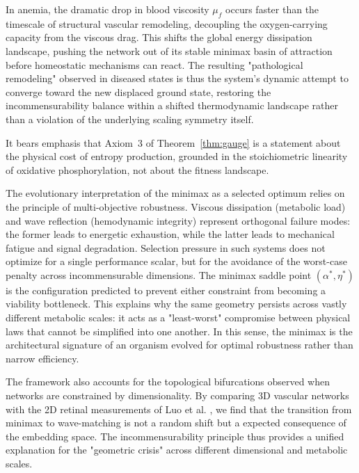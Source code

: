 In anemia, the dramatic drop in blood viscosity $\mu_f$ occurs faster than the
timescale of structural vascular remodeling, decoupling the oxygen-carrying
capacity from the viscous drag. This shifts the global energy dissipation
landscape, pushing the network out of its stable minimax basin of attraction
before homeostatic mechanisms can react. The resulting "pathological remodeling"
observed in diseased states is thus the system's dynamic attempt to converge
toward the new displaced ground state, restoring the incommensurability balance
within a shifted thermodynamic landscape rather than a violation of the
underlying scaling symmetry itself.


It bears emphasis that Axiom~3 of Theorem~\ref{thm:gauge} is a statement about
the physical cost of entropy production, grounded in the stoichiometric
linearity of oxidative phosphorylation, not about the fitness landscape.

\begin{remark}
The evolutionary interpretation of the minimax as a selected optimum relies on
the principle of multi-objective robustness. Viscous dissipation (metabolic
load) and wave reflection (hemodynamic integrity) represent orthogonal failure
modes: the former leads to energetic exhaustion, while the latter leads to
mechanical fatigue and signal degradation. Selection pressure in such systems
does not optimize for a single performance scalar, but for the avoidance of the
worst-case penalty across incommensurable dimensions. The minimax saddle point
$(\alpha^*, \eta^*)$ is the configuration predicted to prevent either
constraint from becoming a viability bottleneck. This explains why the
same geometry persists across vastly different metabolic scales: it acts as
a "least-worst" compromise between physical laws that cannot be simplified into
one another. In this sense, the minimax is the architectural signature of an
organism evolved for optimal robustness rather than narrow efficiency.
\end{remark}

The framework also accounts for the topological bifurcations observed when
networks are constrained by dimensionality. By comparing 3D vascular networks
with the 2D retinal measurements of Luo et al. \cite{luo2017}, we find that the
transition from minimax to wave-matching is not a random shift but a
expected consequence of the embedding space. The incommensurability
principle thus provides a unified explanation for the "geometric crisis"
across different dimensional and metabolic scales.

